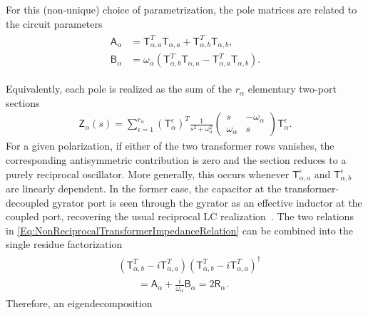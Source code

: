 \documentclass[prx,aps,twocolumn,article]{revtex4-2}
\newcommand{\msf}[1]{\mathsf{#1}}
\newcommand{\msT}{\msf{T}}
\newcommand{\msZ}{\msf{Z}}
\newcommand{\msA}{\msf{A}}
\newcommand{\msB}{\msf{B}}
\newcommand{\msR}{\msf{R}}
\begin{document}
For this (non-unique) choice of parametrization, the pole matrices are related to the circuit parameters
\begin{align}
\begin{aligned}
    \msA_\alpha
    &=
    \msT_{\alpha,a}^T\msT_{\alpha,a}
    +
    \msT_{\alpha,b}^T\msT_{\alpha,b},
    \\
    \msB_\alpha
    &=
    \omega_\alpha
    \left(
        \msT_{\alpha,b}^T\msT_{\alpha,a}
        -
        \msT_{\alpha,a}^T\msT_{\alpha,b}
    \right).
\end{aligned}
\label{Eq:NonReciprocalTransformerImpedanceRelation}
\end{align}

Equivalently, each pole is realized as the sum of the $r_\alpha$ elementary two-port sections
\begin{align}
    \msZ_\alpha(s)
    =
    \sum_{\epsilon=1}^{r_\alpha}
    \left(\msT_\alpha^\epsilon\right)^T
    \frac{1}{s^2+\omega_\alpha^2}
    \begin{pmatrix}
        s & -\omega_\alpha\\
        \omega_\alpha & s
    \end{pmatrix}
    \msT_\alpha^\epsilon.
    \label{Eq:CanonicalPoleRealization}
\end{align}
For a given polarization, if either of the two transformer rows vanishes, the corresponding antisymmetric contribution is zero and the section reduces to a purely reciprocal oscillator. More generally, this occurs whenever $\msT_{\alpha,a}^\epsilon$ and $\msT_{\alpha,b}^\epsilon$ are linearly dependent. In the former case, the capacitor at the transformer-decoupled gyrator port is seen through the gyrator as an effective inductor at the coupled port, recovering the usual reciprocal LC realization~\cite{Newcomb:1966}. The two relations in \cref{Eq:NonReciprocalTransformerImpedanceRelation}
can be combined into the single residue factorization
\begin{align}
\begin{aligned}
    &
    \left(
        \msT_{\alpha,b}^T
        -
        i\msT_{\alpha,a}^T
    \right)
    \left(
        \msT_{\alpha,b}^T
        -
        i\msT_{\alpha,a}^T
    \right)^\dag
    \\
    &\qquad=
    \msA_\alpha
    +
    \frac{i}{\omega_\alpha}
    \msB_\alpha
    =
    2\msR_\alpha.
\end{aligned}
\label{Eq:TransformerResidueFactorization}
\end{align}
Therefore, an eigendecomposition
\end{document}
